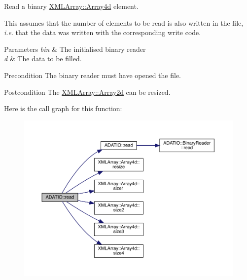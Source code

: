 Read a binary \mbox{\hyperlink{classXMLArray_1_1Array4d}{X\+M\+L\+Array\+::\+Array4d}} element. 

This assumes that the number of elements to be read is also written in the file, {\itshape i.\+e}. that the data was written with the corresponding write code. 
\begin{DoxyParams}{Parameters}
{\em bin} & The initialised binary reader \\
\hline
{\em d} & The data to be filled.\\
\hline
\end{DoxyParams}
\begin{DoxyPrecond}{Precondition}
The binary reader must have opened the file. 
\end{DoxyPrecond}
\begin{DoxyPostcond}{Postcondition}
The \mbox{\hyperlink{classXMLArray_1_1Array2d}{X\+M\+L\+Array\+::\+Array2d}} can be resized. 
\end{DoxyPostcond}
Here is the call graph for this function\+:
\nopagebreak
\begin{figure}[H]
\begin{center}
\leavevmode
\includegraphics[width=350pt]{d0/dba/namespaceADATIO_a0e3333d0774c69f2c6a38b013e23d02b_cgraph}
\end{center}
\end{figure}
\mbox{\label{namespaceADATIO_a0b5c3397d644a4f522e7b097825986cb}} 
